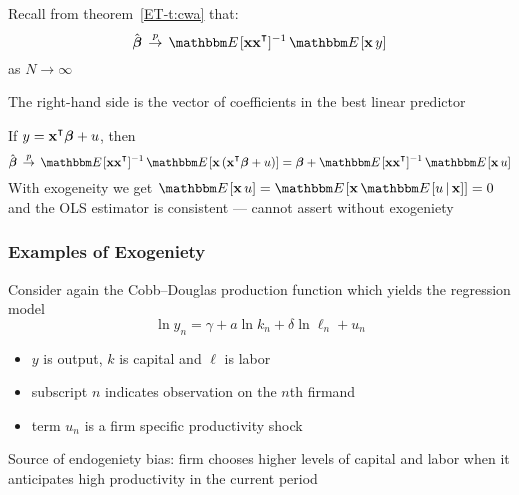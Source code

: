 \begin{frame}

    \vspace{2em}
    Recall from theorem~\ref{ET-t:cwa} that:
    $$\hboldbeta \, \toprob  \, \EE[ \boldx \boldx^\T]^{-1} \, \EE[\boldx \, y]$$
    as $N \to \infty$
    
    The right-hand side is the vector of coefficients in the
    best linear predictor
    
    \vspace{.7em}
    If $y = \boldx^\T
    \boldbeta + u$, then
    \begin{equation*}
        \hboldbeta \, 
         \toprob  \,
         \EE[ \boldx \boldx^\T]^{-1} \, \EE[\boldx \, (\boldx^\T \boldbeta + u)]
        =\boldbeta  + \EE[ \boldx \boldx^\T]^{-1} \, \EE[\boldx \,  u]
    \end{equation*}
    With exogeneity we get $\EE[\boldx \,  u] =  \EE[ \boldx \, \EE[ u \given \boldx
    ] ] = 0$ and the OLS estimator is consistent --- cannot
    assert without exogeniety 
 
\end{frame}

\begin{frame}\frametitle{Examples of Exogeniety}

    \vspace{2em}
    Consider again the Cobb--Douglas production function which yields the regression model
    \begin{equation*}
        \ln y_n = \gamma + a \ln k_n + \delta \ln \ell_n + u_n
    \end{equation*}
    \begin{itemize}
        \item $y$ is output, $k$ is capital and $\ell$ is labor
        \item subscript $n$
            indicates observation on the $n$th firmand 
        \item term $u_n$ is a firm specific
        productivity shock
    \end{itemize}
    
    Source of endogeniety bias: firm chooses higher
    levels of capital and labor when it anticipates high productivity in the
    current period
    
\end{frame}

